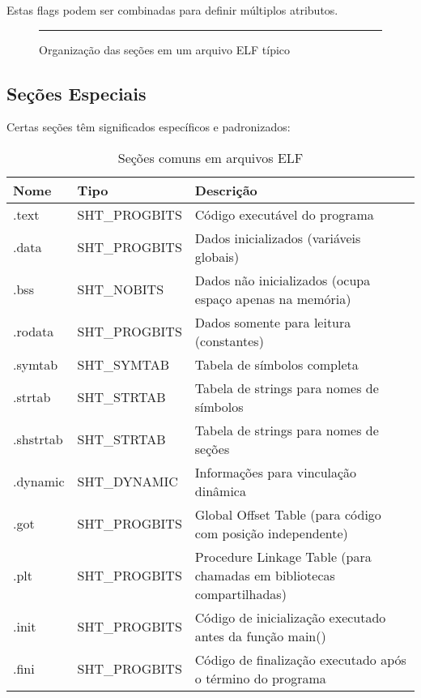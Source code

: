 Estas flags podem ser combinadas para definir múltiplos atributos.

\begin{figure}[ht]
    \centering
    \rule{10cm}{6cm} %
    \caption{Organização das seções em um arquivo ELF típico}
    \label{fig:section_organization}
\end{figure}

\subsection{Seções Especiais}\label{subsec:special_sections}

Certas seções têm significados específicos e padronizados:

\begin{table}[ht]
    \centering
    \caption{Seções comuns em arquivos ELF}
    \label{tab:common_sections}
    \begin{tabular}{|l|l|l|}
        \hline
        \textbf{Nome} & \textbf{Tipo} & \textbf{Descrição} \\
        \hline
        .text & SHT\_PROGBITS & Código executável do programa \\
        .data & SHT\_PROGBITS & Dados inicializados (variáveis globais) \\
        .bss & SHT\_NOBITS & Dados não inicializados (ocupa espaço apenas na memória) \\
        .rodata & SHT\_PROGBITS & Dados somente para leitura (constantes) \\
        .symtab & SHT\_SYMTAB & Tabela de símbolos completa \\
        .strtab & SHT\_STRTAB & Tabela de strings para nomes de símbolos \\
        .shstrtab & SHT\_STRTAB & Tabela de strings para nomes de seções \\
        .dynamic & SHT\_DYNAMIC & Informações para vinculação dinâmica \\
        .got & SHT\_PROGBITS & Global Offset Table (para código com posição independente) \\
        .plt & SHT\_PROGBITS & Procedure Linkage Table (para chamadas em bibliotecas compartilhadas) \\
        .init & SHT\_PROGBITS & Código de inicialização executado antes da função main() \\
        .fini & SHT\_PROGBITS & Código de finalização executado após o término do programa \\
        \hline
    \end{tabular}
\end{table}

